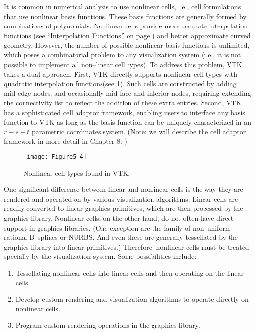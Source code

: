 It is common in numerical analysis to use nonlinear cells, i.e., cell formulations that use nonlinear basis functions. These basis functions are generally formed by combinations of polynomials. Nonlinear cells provide more accurate interpolation functions (see ``Interpolation Functions'' on page \pageref{sec:interpolation_functions}) and better approximate curved geometry. However, the number of possible nonlinear basis functions is unlimited, which poses a combinatorial problem to any visualization system (i.e., it is not possible to implement all non--linear cell types). To address this problem, VTK takes a dual approach. First, VTK directly supports nonlinear cell types with quadratic interpolation functions(see \ref{fig:Figure5-4}). Such cells are constructed by adding mid-edge nodes, and occasionally mid-face and interior nodes, requiring extending the connectivity list to reflect the addition of these extra entries. Second, VTK has a sophisticated cell adaptor framework, enabling users to interface any basis function to VTK as long as the basis function can be uniquely characterized in an $r-s-t$ parametric coordinates system. (Note: we will describe the cell adaptor framework in more detail in Chapter 8: ).


\begin{figure}[!htb]
	\centering
	\texttt{[image: Figure5-4]}
	\caption{Nonlinear cell types found in VTK.}
	\label{fig:Figure5-4}
\end{figure}

One significant difference between linear and nonlinear cells is the way they are rendered and operated on by various visualization algorithms. Linear cells are readily converted to linear graphics primitives, which are then processed by the graphics library. Nonlinear cells, on the other hand, do not often have direct support in graphics libraries. (One exception are the family of non--uniform rational B--splines or NURBS. And even these are generally tessellated by the graphics library into linear primitives.) Therefore, nonlinear cells must be treated specially by the visualization system. Some possibilities include:

\begin{enumerate}

\item Tessellating nonlinear cells into linear cells and then operating on the linear cells.

\item Develop custom rendering and visualization algorithms to operate directly on nonlinear cells.

\item Program custom rendering operations in the graphics library.

\end{enumerate}


